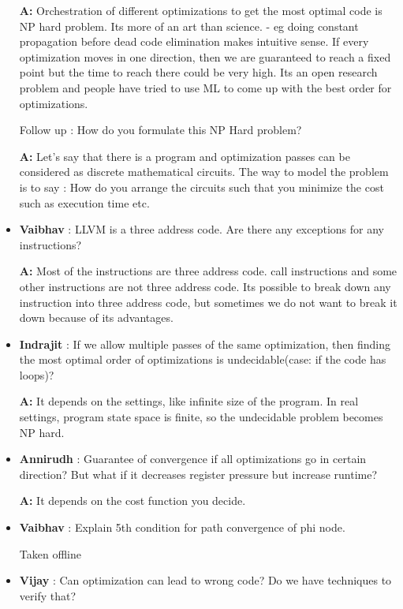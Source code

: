 \begin{itemize}
    \textbf{A:} Orchestration of different optimizations to get the most optimal code is NP hard problem. Its more of an art than science. - eg doing constant propagation before dead code elimination makes intuitive sense. If every optimization moves in one direction, then we are guaranteed to reach a fixed point but the time to reach there could be very high. Its an open research problem and people have tried to use ML to come up with the best order for optimizations.
    
        Follow up : How do you formulate this NP Hard problem?
        
        \textbf{A:} Let's say that there is a program and optimization passes can be considered as discrete mathematical circuits. The way to model the problem is to say : How do you arrange the circuits such that you minimize the cost such as execution time etc.
    
    \item \textbf{Vaibhav} :  LLVM is a three address code. Are there any exceptions for any instructions?
    
    \textbf{A:} Most of the instructions are three address code. call instructions and some other instructions are not three address code. Its possible to break down any instruction into three address code, but sometimes we do not want to break it down because of its advantages.
    
    \item\textbf{Indrajit} : If we allow multiple passes of the same optimization, then finding the most optimal order of optimizations is undecidable(case: if the code has loops)?
    
    \textbf{A:} It depends on the settings, like infinite size of the program. 
    In real settings, program state space is finite, so the undecidable problem becomes NP hard. 
    
    \item \textbf{Annirudh} : Guarantee of convergence if all optimizations go in certain direction? But what if it decreases register pressure but increase runtime?
    
    \textbf{A:} It depends on the cost function you decide.
    
    \item \textbf{Vaibhav} : Explain 5th condition for path convergence of phi node.
    
    Taken offline
    
    \item \textbf{Vijay} : Can optimization can lead to wrong code? Do we have techniques to verify that?
    

\end{itemize}
